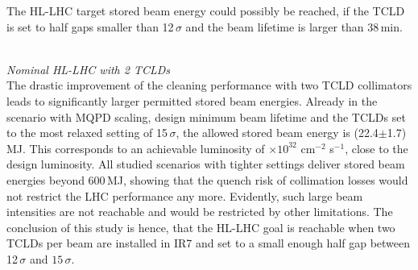 \newpage
The HL-LHC target stored beam energy could possibly be reached, if the TCLD is set to half gaps smaller than 12$\,\sigma$ and the beam lifetime is larger than 38\,min.







 \mbox{} \\ 
\textit{Nominal HL-LHC with 2 TCLDs} \\ 
The drastic improvement of the cleaning performance with two TCLD collimators leads to significantly larger permitted stored beam energies. Already in the scenario with MQPD scaling, design minimum beam lifetime and the TCLDs set to the most relaxed setting of 15\,$\sigma$, the allowed stored beam energy is (22.4$\pm$1.7)\,MJ. This corresponds to an achievable luminosity of $\times 10^{32}$ cm$^{-2}$ s$^{-1}$, close to the design luminosity. All studied scenarios with tighter settings deliver stored beam energies beyond 600\,MJ, showing that the quench risk of collimation losses would not restrict the LHC performance any more. Evidently, such large beam intensities are not reachable and would be restricted by other limitations. The conclusion of this study is hence, that the HL-LHC goal is reachable when two TCLDs per beam are installed in IR7 and set to a small enough half gap between 12$\,\sigma$ and $15\,\sigma$.



